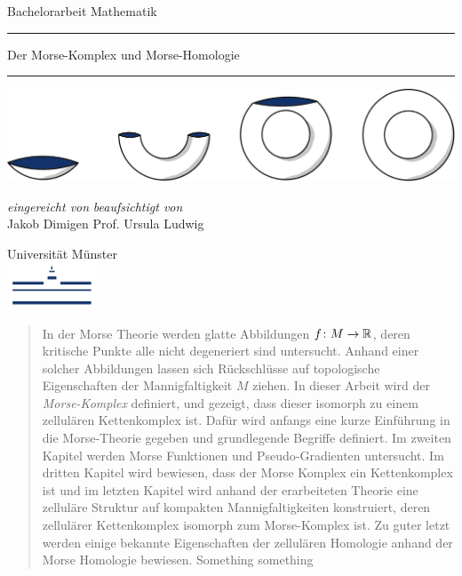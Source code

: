 \documentclass[a4paper,12pt,twoside]{scrreport}
\begin{document}
\makeheaderempty

\begin{titlepage}
    \centering
    Bachelorarbeit Mathematik \\
    \color{DarkBlue}\rule{\linewidth}{1pt}
    \color{Black}\Huge Der Morse-Komplex und Morse-Homologie \\[14pt]
    \color{DarkBlue}\rule{\linewidth}{2pt}
    \color{Black}

    \vspace{3cm}
    \includegraphics[width=\textwidth]{../resources/Me-Titlepage-Color.jpeg}

    \vfill
    \small

    \textit{eingereicht von}
    \hfill
    \textit{beaufsichtigt von} \\
    Jakob Dimigen
    \hfill
    Prof. Ursula Ludwig

    \vspace{2cm}

    Universität Münster \\
    \vspace{0.02cm}
    \includegraphics[width=0.2\textwidth]{../resources/WWU_Logo.png}
\end{titlepage}

\tableofcontents

\begin{abstract}
    In der Morse Theorie werden glatte Abbildungen $f \colon M \to { \mathbb R }$, deren kritische Punkte 
    alle nicht degeneriert sind untersucht. Anhand einer solcher Abbildungen lassen sich
    Rückschlüsse auf topologische Eigenschaften der Mannigfaltigkeit $M$ ziehen. In dieser Arbeit
    wird der \textit{Morse-Komplex} definiert, und gezeigt, dass dieser isomorph zu einem zellulären 
    Kettenkomplex ist. Dafür wird anfangs eine kurze Einführung in die Morse-Theorie gegeben und 
    grundlegende Begriffe definiert. Im zweiten Kapitel werden Morse Funktionen und Pseudo-Gradienten 
    untersucht. Im dritten Kapitel wird bewiesen, dass der Morse Komplex ein Kettenkomplex ist und 
    im letzten Kapitel wird anhand der erarbeiteten Theorie eine zelluläre Struktur auf kompakten 
    Mannigfaltigkeiten konstruiert, deren zellulärer Kettenkomplex isomorph zum Morse-Komplex ist.
    Zu guter letzt werden einige bekannte Eigenschaften der zellulären Homologie anhand der 
    Morse Homologie bewiesen. Something something
\end{abstract}
\end{document}
